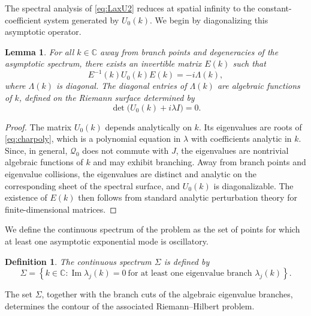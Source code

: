 \documentclass[11pt]{amsart}
\newtheorem{lemma}{Lemma}[section]
\newtheorem{definition}{Definition}[section]
\theoremstyle{definition}
\numberwithin{equation}{section}
\begin{document}
The spectral analysis of \eqref{eq:LaxU2} reduces at spatial infinity to the constant-coefficient system generated by $U_0(k)$. We begin by diagonalizing this asymptotic operator.

\begin{lemma}
For all $k \in \mathbb{C}$ away from branch points and degeneracies of the asymptotic spectrum, there exists an invertible matrix $E(k)$ such that
\begin{equation}
E^{-1}(k) U_0(k) E(k) = -i\Lambda(k),
\label{eq:diagU0_2}
\end{equation}
where $\Lambda(k)$ is diagonal. The diagonal entries of $\Lambda(k)$ are algebraic functions of $k$, defined on the Riemann surface determined by
\begin{equation}
\det\bigl(U_0(k) + i\lambda I\bigr) = 0.
\label{eq:charpoly}
\end{equation}
\end{lemma}

\begin{proof}
The matrix $U_0(k)$ depends analytically on $k$. Its eigenvalues are roots of \eqref{eq:charpoly}, which is a polynomial equation in $\lambda$ with coefficients analytic in $k$. Since, in general, $\mathcal Q_0$ does not commute with $J$, the eigenvalues are nontrivial algebraic functions of $k$ and may exhibit branching. Away from branch points and eigenvalue collisions, the eigenvalues are distinct and analytic on the corresponding sheet of the spectral surface, and $U_0(k)$ is diagonalizable. The existence of $E(k)$ then follows from standard analytic perturbation theory for finite-dimensional matrices.
\end{proof}

We define the continuous spectrum of the problem as the set of points for which at least one asymptotic exponential mode is oscillatory.

\begin{definition}
The continuous spectrum $\Sigma$ is defined by
\begin{equation}
\Sigma =
\left\{
k \in \mathbb{C} :
\operatorname{Im}\lambda_j(k)=0
\ \text{for at least one eigenvalue branch } \lambda_j(k)
\right\}.
\label{eq:ContinuousSpectrum}
\end{equation}
\end{definition}

The set $\Sigma$, together with the branch cuts of the algebraic eigenvalue branches, determines the contour of the associated Riemann--Hilbert problem.
\end{document}
